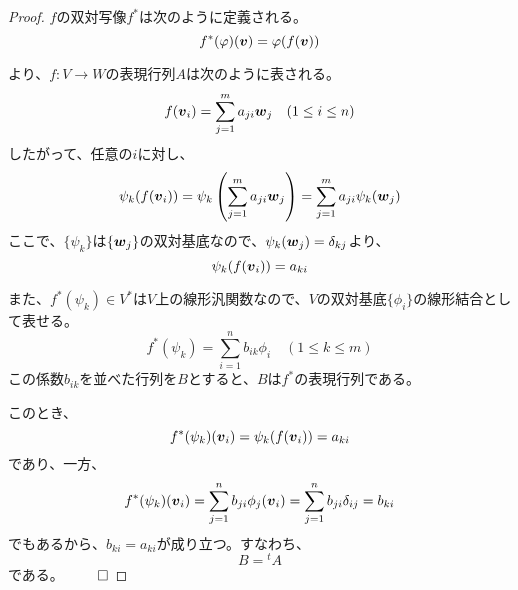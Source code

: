 \documentclass[../../../topic_linear-algebra]{subfiles}
\begin{document}
\begin{proof}
  $f$の双対写像$f^*$は次のように定義される。
  \begin{equation*}
    f^*(\varphi)(\vb*{v}) = \varphi(f(\vb*{v}))
  \end{equation*}
  
  \br
  
  より、$f \colon V \to W$の表現行列$A$は次のように表される。
  \begin{equation*}
    f(\vb*{v}_i) = \sum_{j=1}^m a_{ji} \vb*{w}_j \quad (1 \leq i \leq n)
  \end{equation*}
  したがって、任意の$i$に対し、
  \begin{equation*}
    \psi_k(f(\vb*{v}_i)) = \psi_k\left(\sum_{j=1}^m a_{ji} \vb*{w}_j\right) = \sum_{j=1}^m a_{ji} \psi_k(\vb*{w}_j)
  \end{equation*}
  ここで、$\{ \psi_k \}$は$\{ \vb*{w}_j \}$の双対基底なので、$\psi_k(\vb*{w}_j) = \delta_{kj}$より、
  \begin{equation*}
    \psi_k(f(\vb*{v}_i)) = a_{ki}
  \end{equation*}
  
  \br

  また、$f^*(\psi_k) \in V^*$は$V$上の線形汎関数なので、$V$の双対基底$\{ \phi_i \}$の線形結合として表せる。
  \begin{equation*}
    f^*(\psi_k) = \sum_{i=1}^n b_{ik} \phi_i \quad (1 \leq k \leq m)
  \end{equation*}
  この係数$b_{ik}$を並べた行列を$B$とすると、$B$は$f^*$の表現行列である。
  
  \br
  
  このとき、
  \begin{equation*}
    f^*(\psi_k)(\vb*{v}_i) = \psi_k(f(\vb*{v}_i)) = a_{ki}
  \end{equation*}
  であり、一方、
  \begin{equation*}
    f^*(\psi_k)(\vb*{v}_i) = \sum_{j=1}^n b_{ji} \phi_j(\vb*{v}_i) = \sum_{j=1}^n b_{ji} \delta_{ij} = b_{ki}
  \end{equation*}
  でもあるから、$b_{ki} = a_{ki}$が成り立つ。すなわち、
  \begin{equation*}
    B = {}^tA
  \end{equation*}
  である。 $\qed$
\end{proof}
\end{document}
